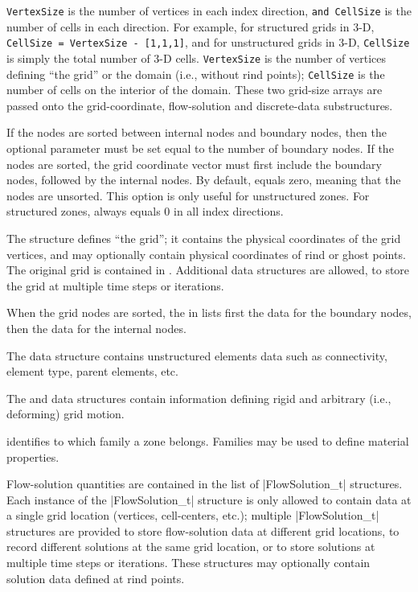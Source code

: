 \texttt{VertexSize} is the number of vertices in each index direction,
\texttt{and CellSize} is the number of cells in each direction.
For example, for structured grids in 3-D, \texttt{CellSize = VertexSize -
[1,1,1]}, and for unstructured grids in 3-D, \texttt{CellSize} is
simply the total number of 3-D cells.
\texttt{VertexSize} is the number of vertices defining ``the grid'' or
the domain (i.e., without rind points); \texttt{CellSize} is the number
of cells on the interior of the domain.
These two grid-size arrays are passed onto the grid-coordinate,
flow-solution and discrete-data substructures.

If the nodes are sorted between internal nodes and boundary nodes,
then the optional parameter  must be set equal
to the number of boundary nodes.
If the nodes are sorted, the grid coordinate vector must first include
the boundary nodes, followed by the internal nodes.
By default,  equals zero, meaning that the nodes
are unsorted.
This option is only useful for unstructured zones.
For structured zones,  always equals 0 in all
index directions.

The  structure defines ``the grid''; it contains
the physical coordinates of the grid vertices, and may optionally
contain physical coordinates of rind or ghost points.
The original grid is contained in .
Additional  data structures are allowed, to
store the grid at multiple time steps or iterations.

When the grid nodes are sorted, the  in
 lists first the data for the boundary nodes,
then the data for the internal nodes.

The  data structure contains unstructured elements
data such as connectivity, element type, parent elements, etc.

The  and  data
structures contain information defining rigid and arbitrary (i.e.,
deforming) grid motion.

 identifies to which family a zone belongs.
Families may be used to define material properties.

Flow-solution quantities are contained in the list of |FlowSolution_t|
structures.
Each instance of the |FlowSolution_t| structure is only allowed to
contain data at a single grid location (vertices, cell-centers, etc.);
multiple |FlowSolution_t| structures are provided to store flow-solution
data at different grid locations, to record different solutions at
the same grid location, or to store solutions at multiple time steps
or iterations.
These structures may optionally contain solution data defined at rind
points.

